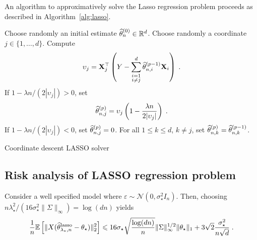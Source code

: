An algorithm to approximatively solve the Lasso regression problem proceeds as described in Algorithm~\ref{alg:lasso}.
\begin{algorithm}
\centering
\begin{algorithmic}
\State Choose randomly an initial estimate $\widehat {\theta}_n^{(0)}\in\mathbb{R}^d$.
\State Choose randomly a coordinate $j\in\{1,\ldots, d\}$.
\State Compute
\[
\upsilon_{j}={\bf X}^\top_{j}\left(Y-\sum_{\substack{i=1\\ i\neq j}}^d\widehat{\theta}^{(p-1)}_{n,i}{\bf X}_{i}\right)\;.
\]
\State If $1 - \lambda n/(2 |\upsilon_j|)>0$, set 
\[
\widehat{\theta}^{(p)}_{n,j}= \upsilon_j\left(1 - \frac{\lambda n }{2 |\upsilon_j|}\right)\;.
\]
\State If $1 - \lambda n/(2 |\upsilon_j|)<0$, set $\widehat{\theta}^{(p)}_{n,j}=0$.
\State For all $1\leqslant k \leqslant d$, $k\neq j$, set $\widehat{\theta}^{(p)}_{n,k} = \widehat{\theta}^{(p-1)}_{n,k}$.
\EndFor
\end{algorithmic}
\caption{Coordinate descent LASSO solver}
\label{alg:lasso}
\end{algorithm}

\subsection{Risk analysis of LASSO regression problem}
\begin{proposition}
Consider a well specified model where $\varepsilon \sim \mathcal{N}(0,\sigma_\star^2 I_n)$. Then, choosing $n\lambda_\star^2/(16\sigma_\star^2  \|\Sigma\|_\infty) = \log(dn)$ yields
$$
\frac{1}{n}\mathbb{E}\left[\|X(\widehat{\theta}^{\mathrm{lasso}}_{\lambda_\star,n}-\theta_\star)\|_2^2\right] \leqslant  16\sigma_\star\sqrt{\frac{\log(dn)}{n}}\|\Sigma\|_\infty^{1/2}\|\theta_\star\|_1  + 3\sqrt{2}\frac{\sigma_\star^2}{n\sqrt{d}} \;.
$$
\end{proposition}

